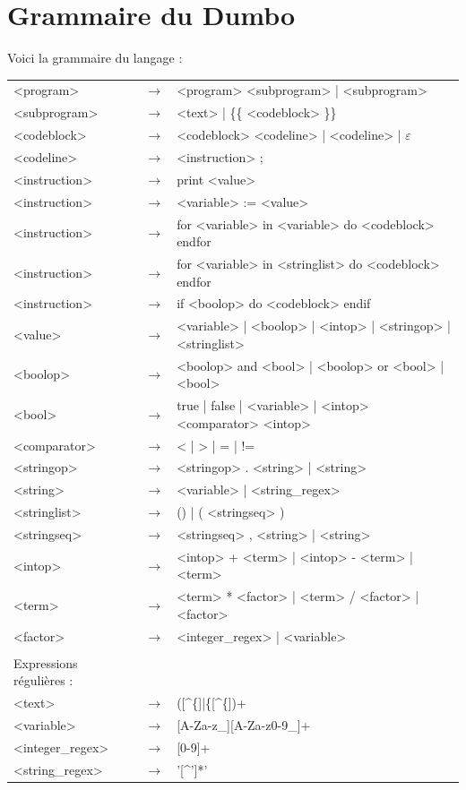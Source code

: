 \documentclass[10pt,a4paper]{article}
\begin{document}
	\newpage
	\section{Grammaire du Dumbo}
	Voici la grammaire du langage :\\
	\begin{tabular}{|l l l|}
		\hline
		
		<program> & $\longrightarrow$ & <program> <subprogram> | <subprogram>\\
		<subprogram> & $\longrightarrow$ & <text> | \{\{ <codeblock> \}\} \\
		<codeblock> & $\longrightarrow$ & <codeblock> <codeline> | <codeline> | $\varepsilon$\\
		<codeline> & $\longrightarrow$ & <instruction> ;\\
		<instruction> & $\longrightarrow$ & print <value>\\
		<instruction> & $\longrightarrow$ & <variable> := <value>\\
		<instruction> & $\longrightarrow$ & for <variable> in <variable> do <codeblock> endfor\\
		<instruction> & $\longrightarrow$ & for <variable> in <stringlist> do <codeblock> endfor\\
		<instruction> & $\longrightarrow$ & if <boolop> do <codeblock> endif\\
		
		<value> & $\longrightarrow$ & <variable> | <boolop> | <intop> | <stringop> | <stringlist>\\
		
		<boolop> & $\longrightarrow$ & <boolop> and <bool> | <boolop> or <bool> | <bool>\\
		<bool> & $\longrightarrow$ & true | false | <variable> | <intop> <comparator> <intop>\\
		<comparator> & $\longrightarrow$ & < | > | = | !=\\
		
		<stringop> & $\longrightarrow$ & <stringop> . <string> | <string>\\
		<string> & $\longrightarrow$ & <variable> | <string\_regex>\\
		<stringlist> & $\longrightarrow$ & () | ( <stringseq> )\\
		<stringseq> & $\longrightarrow$ & <stringseq> , <string> | <string>\\
		<intop> & $\longrightarrow$ & <intop> + <term> | <intop> - <term> | <term>\\
		<term> & $\longrightarrow$ & <term> * <factor> | <term> / <factor> | <factor>\\
		<factor> & $\longrightarrow$ & <integer\_regex> | <variable>\\
		&&\\
		Expressions régulières :&&\\
		<text>  & $\longrightarrow$ & ([\^\space \{]|\{[\^\space \{])+\\
		<variable> & $\longrightarrow$ & [A-Za-z\_][A-Za-z0-9\_]+\\
		<integer\_regex> & $\longrightarrow$ & [0-9]+\\
		<string\_regex> & $\longrightarrow$ & '[\^\space ']*'\\
		\hline
	\end{tabular}
\end{document}
